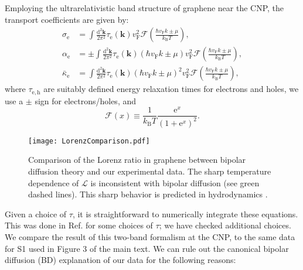 \documentclass[10pt, oneside]{book}
\begin{document}
\begin{doublespace}
\begin{appendix}
Employing the ultrarelativistic band structure of graphene near the CNP, the transport coefficients are given by:
 \begin{subequations}\begin{align}
\sigma_{\mathrm{e}} &= \int \frac{\mathrm{d}^2\mathbf{k}}{2\pi^2} \tau_{\mathrm{e}}(\mathbf{k})  v_{\mathrm{F}}^2 \mathcal{F}\left(\frac{\hbar v_{\mathrm{F}} k \pm \mu}{k_{\mathrm{B}}T}\right), \\
\alpha_{\mathrm{e}} &= \pm \int \frac{\mathrm{d}^2\mathbf{k}}{2\pi^2} \tau_{\mathrm{e}}(\mathbf{k}) (\hbar v_{\mathrm{F}} k \pm \mu) v_{\mathrm{F}}^2 \mathcal{F}\left(\frac{\hbar v_{\mathrm{F}} k \pm \mu}{k_{\mathrm{B}}T}\right), \\
\bar\kappa_{\mathrm{e}} &= \int \frac{\mathrm{d}^2\mathbf{k}}{2\pi^2} \tau_{\mathrm{e}}(\mathbf{k}) (\hbar v_{\mathrm{F}} k \pm \mu)^2 v_{\mathrm{F}}^2\mathcal{F}\left(\frac{\hbar v_{\mathrm{F}} k \pm \mu}{k_{\mathrm{B}}T}\right),
\end{align}\end{subequations}
where $\tau_{\mathrm{e,h}}$ are suitably defined energy relaxation times for electrons and holes, we use a $\pm$ sign for electrons/holes,  and \begin{equation}
\mathcal{F}(x) \equiv \frac{1}{k_{\mathrm{B}}T} \frac{\mathrm{e}^x}{(1+\mathrm{e}^x)^2}.
\end{equation}

\begin{figure}
\centering
\texttt{[image: LorenzComparison.pdf]}
\caption{Comparison of the Lorenz ratio in graphene between bipolar diffusion theory \cite{yoshino} and our experimental data.   The sharp temperature dependence of $\mathcal{L}$ is  inconsistent with bipolar diffusion (see green dashed lines).  This sharp behavior is predicted in hydrodynamics \cite{Lucas:2015sya}.}
\label{FigLorenzComparison}
\end{figure}

Given a choice of $\tau$,  it is straightforward to numerically integrate these equations.  This was done in Ref. \cite{yoshino} for some choices of $\tau$; we have checked additional choices.   We compare the result of this two-band formalism at the CNP, to the same data for S1 used in Figure 3 of the main text.    We can rule out the canonical bipolar diffusion (BD) explanation of our data for the following reasons: 


\end{appendix}
\end{doublespace}
\end{document}
